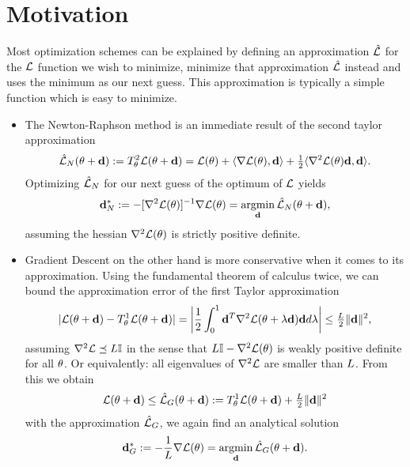 \section{Motivation}

Most optimization schemes can be explained by defining an approximation 
\(\hat{\mathcal{L}}\) for the \(\mathcal{L}\) function we wish to minimize, minimize that
approximation \(\hat{\mathcal{L}}\) instead and uses the minimum as our next guess.
This approximation is typically a simple function which is easy to minimize.

\begin{itemize}
	\item 
	The Newton-Raphson method is an immediate result of the second taylor approximation
	\begin{equation*}
		\hat{\mathcal{L}}_{N}(\theta + \mathbf{d})
		:= T^2_\theta \mathcal{L}(\theta + \mathbf{d})
		= \mathcal{L}(\theta)
		+ \langle \nabla\mathcal{L}(\theta), \mathbf{d}\rangle
		+ \tfrac12 \langle \nabla^2\mathcal{L}(\theta) \mathbf{d}, \mathbf{d}\rangle.
	\end{equation*}
	Optimizing \(\hat{\mathcal{L}}_{N}\) for our next guess of the optimum of \(\mathcal{L}\)
	yields
	\begin{equation*}
		\mathbf{d}^*_{N} := -[\nabla^2\mathcal{L}(\theta)]^{-1}\nabla\mathcal{L}(\theta)
		= \operatorname*{argmin}_{\mathbf{d}} \hat{\mathcal{L}}_{N}(\theta + \mathbf{d}),
	\end{equation*}
	assuming the hessian \(\nabla^2\mathcal{L}(\theta)\) is strictly positive definite.

	\item
	Gradient Descent on the other hand is more conservative when it comes to its
	approximation. Using the fundamental theorem of calculus twice, we can bound
	the approximation error of the first Taylor approximation
	\begin{equation*}
		|\mathcal{L}(\theta+\mathbf{d}) - T^1_\theta \mathcal{L}(\theta+\mathbf{d})|
		= \left| \frac 12 \int_0^1 \mathbf{d}^T \nabla^2\mathcal{L}(\theta + \lambda \mathbf{d})\mathbf{d} d\lambda\right|
		\le \tfrac{L}2 \|\mathbf{d}\|^2,
	\end{equation*}
	assuming \(\nabla^2\mathcal{L} \preceq L\mathbb{I}\) in the sense that \(L\mathbb{I}
	- \nabla^2\mathcal{L}(\theta)\) is weakly positive definite for all \(\theta\). Or
	equivalently: all eigenvalues of \(\nabla^2\mathcal{L}\) are smaller than
	\(L\). From this we obtain
	\begin{equation*}
		\mathcal{L}(\theta + \mathbf{d}) \le \hat{\mathcal{L}}_G(\theta+\mathbf{d})
		:= T^1_\theta \mathcal{L}(\theta+\mathbf{d}) + \tfrac{L}2\|\mathbf{d}\|^2
	\end{equation*}
	with the approximation \(\hat{\mathcal{L}}_{G}\), we again find an analytical
	solution
	\begin{equation*}
		\mathbf{d}^*_{G} := - \frac1{L} \nabla\mathcal{L}(\theta)
		= \operatorname*{argmin}_{\mathbf{d}} \hat{\mathcal{L}}_{G}(\theta + \mathbf{d}).
	\end{equation*}
\end{itemize}

